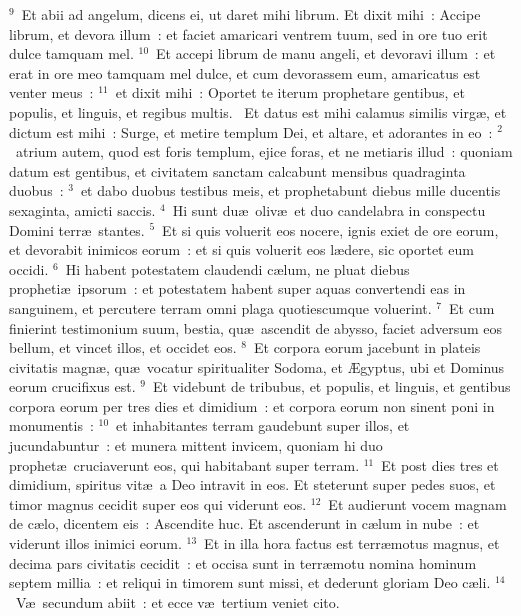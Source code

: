 ${}^{9}$~Et abii ad angelum, dicens ei, ut daret mihi librum. Et dixit mihi~: Accipe librum, et devora illum~: et faciet amaricari ventrem tuum, sed in ore tuo erit dulce tamquam mel.
${}^{10}$~Et accepi librum de manu angeli, et devoravi illum~: et erat in ore meo tamquam mel dulce, et cum devorassem eum, amaricatus est venter meus~:
${}^{11}$~et dixit mihi~: Oportet te iterum prophetare gentibus, et populis, et linguis, et regibus multis.
~\lettrine[lines=10,image=true,loversize=0.05,lraise=-0.03]{E}{}t datus est mihi calamus similis virg\ae , et dictum est mihi~: Surge, et metire templum Dei, et altare, et adorantes in eo~:
${}^{2}$~atrium autem, quod est foris templum, ejice foras, et ne metiaris illud~: quoniam datum est gentibus, et civitatem sanctam calcabunt mensibus quadraginta duobus~:
${}^{3}$~et dabo duobus testibus meis, et prophetabunt diebus mille ducentis sexaginta, amicti saccis.
${}^{4}$~Hi sunt du\ae\ oliv\ae\ et duo candelabra in conspectu Domini terr\ae\ stantes.
${}^{5}$~Et si quis voluerit eos nocere, ignis exiet de ore eorum, et devorabit inimicos eorum~: et si quis voluerit eos l\ae dere, sic oportet eum occidi.
${}^{6}$~Hi habent potestatem claudendi c\ae lum, ne pluat diebus propheti\ae\ ipsorum~: et potestatem habent super aquas convertendi eas in sanguinem, et percutere terram omni plaga quotiescumque voluerint.
${}^{7}$~Et cum finierint testimonium suum, bestia, qu\ae\ ascendit de abysso, faciet adversum eos bellum, et vincet illos, et occidet eos.
${}^{8}$~Et corpora eorum jacebunt in plateis civitatis magn\ae , qu\ae\ vocatur spiritualiter Sodoma, et \AE gyptus, ubi et Dominus eorum crucifixus est.
${}^{9}$~Et videbunt de tribubus, et populis, et linguis, et gentibus corpora eorum per tres dies et dimidium~: et corpora eorum non sinent poni in monumentis~:
${}^{10}$~et inhabitantes terram gaudebunt super illos, et jucundabuntur~: et munera mittent invicem, quoniam hi duo prophet\ae\ cruciaverunt eos, qui habitabant super terram.
${}^{11}$~Et post dies tres et dimidium, spiritus vit\ae\ a Deo intravit in eos. Et steterunt super pedes suos, et timor magnus cecidit super eos qui viderunt eos.
${}^{12}$~Et audierunt vocem magnam de c\ae lo, dicentem eis~: Ascendite huc. Et ascenderunt in c\ae lum in nube~: et viderunt illos inimici eorum.
${}^{13}$~Et in illa hora factus est terr\ae motus magnus, et decima pars civitatis cecidit~: et occisa sunt in terr\ae motu nomina hominum septem millia~: et reliqui in timorem sunt missi, et dederunt gloriam Deo c\ae li.
${}^{14}$~V\ae\ secundum abiit~: et ecce v\ae\ tertium veniet cito.



